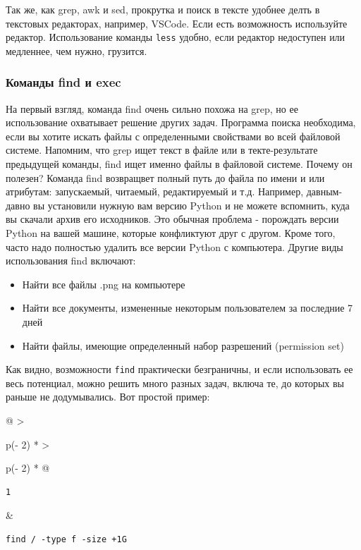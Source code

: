 \documentclass{article}
\begin{document}
Так же, как grep, awk и sed, прокрутка и поиск в тексте удобнее делть в
текстовых редакторах, например, VSCode. Если есть возможность
используйте редактор. Использование команды \texttt{less} удобно, если
редактор недоступен или медленнее, чем нужно, грузится.

\hypertarget{find-and-exec}{%
\subsubsection{\texorpdfstring{\protect\hyperlink{find-and-exec}{}Команды
find и exec}{Команды find и exec}}\label{find-and-exec}}

На первый взгляд, команда find очень сильно похожа на grep, но ее
использование охватывает решение других задач. Программа поиска
необходима, если вы хотите искать файлы с определенными свойствами во
всей файловой системе. Напомним, что grep ищет текст в файле или в
текте-результате предыдущей команды, find ищет именно файлы в файловой
системе. Почему он полезен? Команда find возвращвет полный путь до файла
по имени и или атрибутам: запускаемый, читаемый, редактируемый и т.д.
Например, давным-давно вы установили нужную вам версию Python и не
можете вспомнить, куда вы скачали архив его исходников. Это обычная
проблема - порождать версии Python на вашей машине, которые конфликтуют
друг с другом. Кроме того, часто надо полностью удалить все версии
Python с компьютера. Другие виды использования find включают:

\begin{itemize}
\tightlist
\item
  Найти все файлы .png на компьютере
\item
  Найти все документы, измененные некоторым пользователем за последние 7
  дней
\item
  Найти файлы, имеющие определенный набор разрешений (permission set)
\end{itemize}

Как видно, возможности \texttt{find} практически безграничны, и если
использовать ее весь потенциал, можно решить много разных задач, включа
те, до которых вы раньше не додумывались. Вот простой пример:

\begin{longtable}[]{@{}
  >{\raggedright\arraybackslash}p{(\columnwidth - 2\tabcolsep) * }
  >{\raggedright\arraybackslash}p{(\columnwidth - 2\tabcolsep) * }@{}}
\toprule
\endhead
\begin{minipage}[t]{\linewidth}\raggedright
\begin{verbatim}
1
\end{verbatim}
\end{minipage} & \begin{minipage}[t]{\linewidth}\raggedright
\begin{verbatim}
find / -type f -size +1G
\end{verbatim}
\end{minipage} \\ \addlinespace
\bottomrule
\end{longtable}
\end{document}
